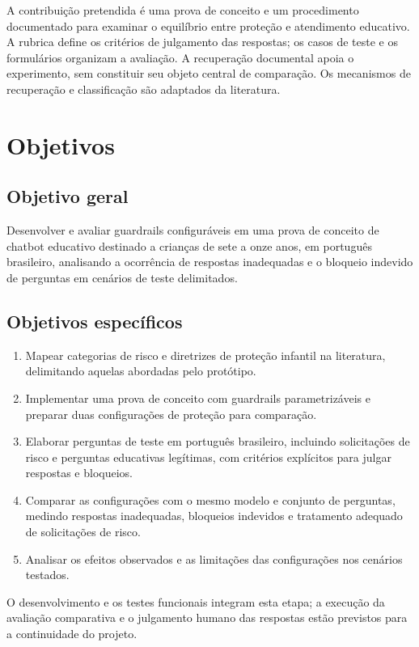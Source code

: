 A contribuição pretendida é uma prova de conceito e um procedimento documentado para examinar o equilíbrio entre proteção e atendimento educativo. A rubrica define os critérios de julgamento das respostas; os casos de teste e os formulários organizam a avaliação. A recuperação documental apoia o experimento, sem constituir seu objeto central de comparação. Os mecanismos de recuperação e classificação são adaptados da literatura.

\section{Objetivos}

\subsection{Objetivo geral}

Desenvolver e avaliar guardrails configuráveis em uma prova de conceito de chatbot educativo destinado a crianças de sete a onze anos, em português brasileiro, analisando a ocorrência de respostas inadequadas e o bloqueio indevido de perguntas em cenários de teste delimitados.

\subsection{Objetivos específicos}

\begin{enumerate}
\item[a)] Mapear categorias de risco e diretrizes de proteção infantil na literatura, delimitando aquelas abordadas pelo protótipo.
\item[b)] Implementar uma prova de conceito com guardrails parametrizáveis e preparar duas configurações de proteção para comparação.
\item[c)] Elaborar perguntas de teste em português brasileiro, incluindo solicitações de risco e perguntas educativas legítimas, com critérios explícitos para julgar respostas e bloqueios.
\item[d)] Comparar as configurações com o mesmo modelo e conjunto de perguntas, medindo respostas inadequadas, bloqueios indevidos e tratamento adequado de solicitações de risco.
\item[e)] Analisar os efeitos observados e as limitações das configurações nos cenários testados.
\end{enumerate}

O desenvolvimento e os testes funcionais integram esta etapa; a execução da avaliação comparativa e o julgamento humano das respostas estão previstos para a continuidade do projeto.
